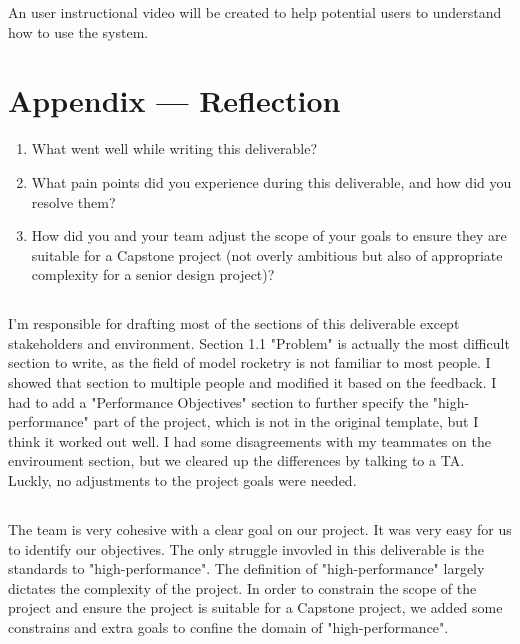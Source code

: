 \documentclass{article}
\begin{document}
An user instructional video will be created to help potential users to
understand how to use the system.

\newpage{}

\section*{Appendix --- Reflection}




\begin{enumerate}
    \item What went well while writing this deliverable?
    \item What pain points did you experience during this deliverable, and how did you
          resolve them?
    \item How did you and your team adjust the scope of your goals to ensure they are
          suitable for a Capstone project (not overly ambitious but also of appropriate
          complexity for a senior design project)?
\end{enumerate}

\subsection*{\color{blue}{Jianqing Liu}}

I'm responsible for drafting most of the sections of this deliverable except
stakeholders and environment. Section 1.1 "Problem" is actually the most
difficult section to write, as the field of model rocketry is not familiar to
most people. I showed that section to multiple people and modified it based on
the feedback. I had to add a "Performance Objectives" section to further
specify the "high-performance" part of the project, which is not in the
original template, but I think it worked out well. I had some disagreements
with my teammates on the enviroument section, but we cleared up the differences
by talking to a TA. Luckly, no adjustments to the project goals were needed.

\subsection{\color{blue}{Shike Chen}}

The team is very cohesive with a clear goal on our project. It was very easy for us to
identify our objectives. The only struggle invovled in this deliverable is the 
standards to "high-performance". The definition of "high-performance" largely dictates
the complexity of the project. In order to constrain the scope of the project and
ensure the project is suitable for a Capstone project, we added some constrains and extra 
goals to confine the domain of "high-performance".



\end{document}
